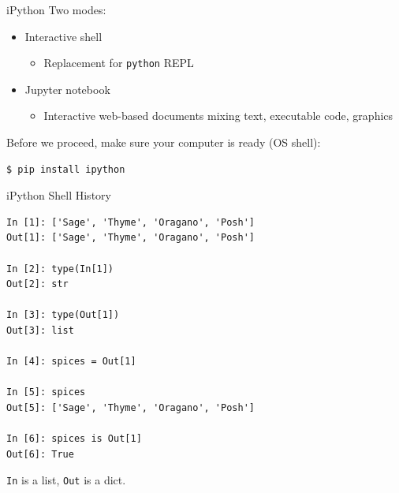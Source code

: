 \documentclass[smaller, aspectratio=1610]{beamer}
\begin{document}
\begin{frame}[label={sec:org9ec309a},fragile]{iPython}
 Two modes:

\begin{itemize}
\item Interactive shell

\begin{itemize}
\item Replacement for \texttt{python} REPL
\end{itemize}

\item Jupyter notebook

\begin{itemize}
\item Interactive web-based documents mixing text, executable code, graphics
\end{itemize}
\end{itemize}

Before we proceed, make sure your computer is ready (OS shell):

\lstset{language=sh,label= ,caption= ,captionpos=b,numbers=none}
\begin{lstlisting}
$ pip install ipython
\end{lstlisting}
\end{frame}

\begin{frame}[label={sec:org7419b39},fragile]{iPython Shell History}
 \lstset{language=sh,label= ,caption= ,captionpos=b,numbers=none}
\begin{lstlisting}
In [1]: ['Sage', 'Thyme', 'Oragano', 'Posh']
Out[1]: ['Sage', 'Thyme', 'Oragano', 'Posh']

In [2]: type(In[1])
Out[2]: str

In [3]: type(Out[1])
Out[3]: list

In [4]: spices = Out[1]

In [5]: spices
Out[5]: ['Sage', 'Thyme', 'Oragano', 'Posh']

In [6]: spices is Out[1]
Out[6]: True
\end{lstlisting}

\texttt{In} is a list, \texttt{Out} is a dict.
\end{frame}
\end{document}
